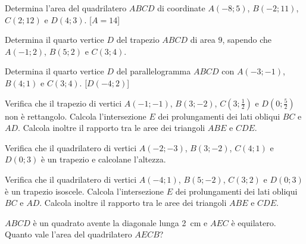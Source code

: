 \begin{multicols}{2}
\begin{esercizio}
\label{ese:7.93}
Determina l'area del quadrilatero $ABCD$ di coordinate $A(-8;5)$, 
$B(-2;11)$, $C(2;12)$ e $D(4;3)$.
\hfill[$A=14$]
\end{esercizio}

\begin{esercizio}
\label{ese:7.94}
Determina il quarto vertice $D$ del trapezio $ABCD$ di area $9$, 
sapendo che $A(-1;2)$, $B(5;2)$ e $C(3;4)$.
\end{esercizio}

\begin{esercizio}
\label{ese:7.95}
Determina il quarto vertice $D$ del parallelogramma $ABCD$ con 
$A(-3;-1)$, $B(4;1)$ e $C(3;4)$.
\hfill[$D(-4;2)$]
\end{esercizio}

\begin{esercizio}
\label{ese:7.96}
Verifica che il trapezio di vertici $A(-1;-1)$, $B(3;-2)$, 
$C\left(3;\frac{1}{2}\right)$ e $D\left(0;\frac{5}{2}\right)$ non è 
rettangolo. Calcola l'intersezione $E$ dei prolungamenti dei lati 
obliqui $BC$ e $AD$. Calcola inoltre il rapporto tra le aree dei 
triangoli $ABE$ e $CDE$.
\end{esercizio}

\begin{esercizio}
\label{ese:7.97}
Verifica che il quadrilatero di vertici $A(-2;-3)$, $B(3;-2)$, 
$C(4;1)$ e $D(0;3)$ è un trapezio e calcolane l'altezza.
\end{esercizio}

\begin{esercizio}
\label{ese:7.98}
Verifica che il quadrilatero di vertici $A(-4;1)$, $B(5;-2)$, 
$C(3;2)$ e $D(0;3)$ è un trapezio isoscele. Calcola l'intersezione $E$ 
dei prolungamenti dei lati obliqui $BC$ e $AD$. Calcola inoltre il 
rapporto tra le aree dei triangoli $ABE$ e $CDE$.
\end{esercizio}

\begin{esercizio}
\label{ese:7.104}
$ABCD$ è un quadrato avente la diagonale lunga 2~cm e $AEC$ è 
equilatero. Quanto vale l'area del quadrilatero $AECB$?
\end{esercizio}

%
%



\end{multicols}
